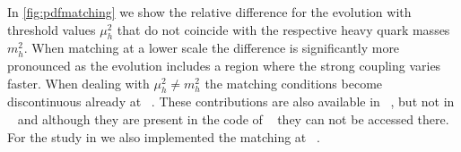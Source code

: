 In \cref{fig:pdfmatching} we show the relative difference for the \pdf{} evolution with
threshold values $\mu_h^2$ that do not coincide with the respective heavy
quark masses $m_h^2$. When matching at a lower scale the difference is
significantly more pronounced as the evolution includes
a region where the strong coupling varies faster. When dealing 
with $\mu_h^2 \neq m_h^2$ the \pdf{} matching conditions become discontinuous
already at \nlo{}~\cite{Buza_1998}. These contributions are also available in
\apfel{}~\cite{Bertone:2013vaa}, but not in \pegasus{}~\cite{Vogt:2004ns} and although they are present in the code
of \qcdnum{}~\cite{Botje:2010ay} they can not be accessed there.
For the study in \cite{Ball:2022qks} we also implemented the \pdf{} matching at
\nnnlo{}~\cite{Bierenbaum:2009zt,Bierenbaum:2009mv,Ablinger:2010ty,Ablinger:2014vwa,Ablinger:2014uka,Behring:2014eya,Ablinger_2014,Ablinger_2015,Blumlein:2017wxd}.
